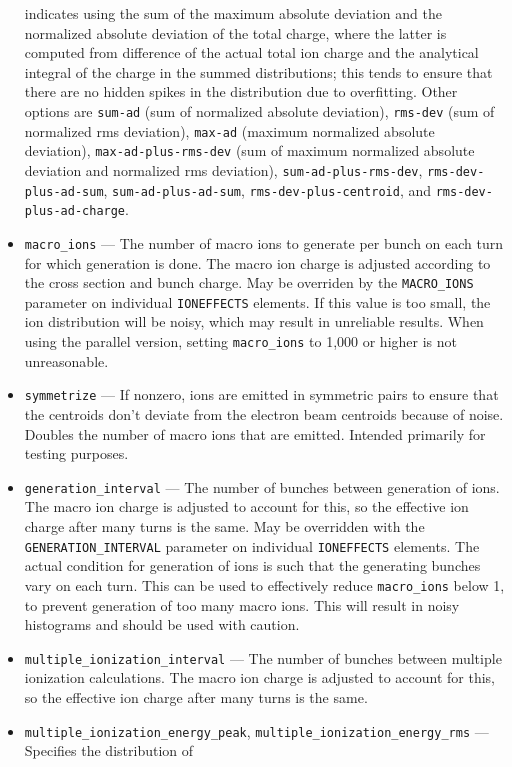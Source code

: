 \documentclass[11pt]{article}
\begin{document}
\begin{itemize}
  indicates using the sum of the maximum absolute deviation and the normalized absolute deviation of the total charge, where
  the latter is computed from difference of the actual total ion charge and the analytical integral of the charge 
  in the summed distributions; this tends to ensure that there are no hidden spikes in the distribution due to overfitting.
  Other options are \verb|sum-ad| (sum of normalized absolute deviation), \verb|rms-dev| (sum of normalized rms deviation),
  \verb|max-ad| (maximum normalized absolute deviation), \verb|max-ad-plus-rms-dev| (sum of maximum normalized absolute 
  deviation and normalized rms deviation), \verb|sum-ad-plus-rms-dev|, \verb|rms-dev-plus-ad-sum|, \verb|sum-ad-plus-ad-sum|,
  \verb|rms-dev-plus-centroid|, and \verb|rms-dev-plus-ad-charge|.
\item \verb|macro_ions| --- The number of macro ions to generate per bunch on each turn for which generation is done. 
  The macro ion charge is adjusted
  according to the cross section and bunch charge. May be overriden by the \verb|MACRO_IONS| parameter on individual
  \verb|IONEFFECTS| elements.
  If this value is too small, the ion distribution will be noisy, which may result in unreliable results.
  When using the parallel version, setting \verb|macro_ions| to 1,000 or higher is not unreasonable.
\item \verb|symmetrize| --- If nonzero, ions are emitted in symmetric pairs to ensure that the centroids don't deviate
  from the electron beam centroids because of noise. Doubles the number of macro ions that are emitted. Intended primarily for
  testing purposes.
\item \verb|generation_interval| --- The number of bunches between generation of ions. The macro ion charge is adjusted
  to account for this, so the effective ion charge after many turns is the same. May be overridden with the
  \verb|GENERATION_INTERVAL| parameter on individual \verb|IONEFFECTS| elements. The actual condition for generation of
  ions is such that the generating bunches vary on each turn. This can be used to effectively reduce \verb|macro_ions|
  below 1, to prevent generation of too many macro ions.
  This will result in noisy histograms and should be used with caution.
\item \verb|multiple_ionization_interval| --- The number of bunches between multiple ionization calculations.  
      The macro ion charge is adjusted
      to account for this, so the effective ion charge after many turns is the same.
\item \verb|multiple_ionization_energy_peak|, \verb|multiple_ionization_energy_rms| --- Specifies the distribution of

\end{itemize}
\end{document}
